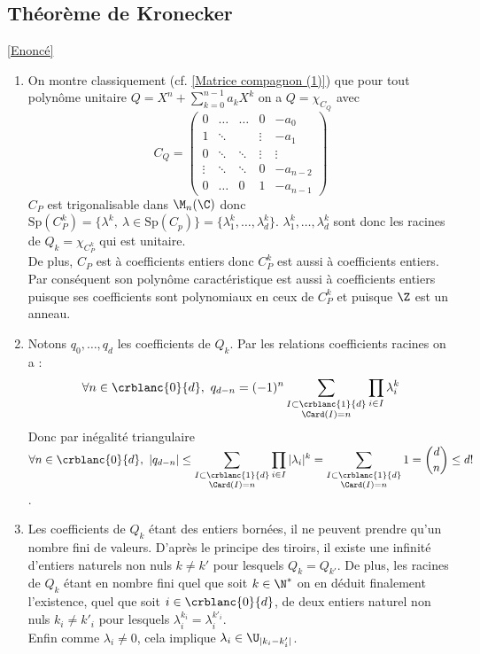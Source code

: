 \documentclass[8pt]{book}
\begin{document}
	\subsection{Théorème de Kronecker }
	\label{Théorème de Kronecker corrigé}
	\textcolor{blue}{\hyperref[Théorème de Kronecker]{[Enoncé]}}\\
	\begin{enumerate}[leftmargin=*]
		\item On montre classiquement (cf. \ref{Matrice compagnon (1)}) que pour tout polynôme unitaire $Q=X^n+\displaystyle\sum_{k=0}^{n-1}a_kX^k$ on a $Q=\chi_{C_Q}$ avec $$C_Q=
		\begin{pmatrix}
			0&\dots&\dots&0&-a_0\\
			1&\ddots&\ &\vdots&-a_1\\
			0&\ddots&\ddots&\vdots&\vdots\\
			\vdots&\ddots&\ddots&0&-a_{n-2}\\
			0&\dots&0&1&-a_{n-1}
		\end{pmatrix}$$
		$C_P$ est trigonalisable dans $\M_n(\C)$ donc $\text{Sp}(C_P^k)=\{\lambda^k,\ \lambda\in \text{Sp}(C_p)\}=\{\lambda_1^k,\dots,\lambda_d^k\}$. $\lambda_1^k,\dots,\lambda_d^k$ sont donc les racines de $Q_k=\chi_{C_P^k}$ qui est unitaire.\\
		De plus, $C_P$ est à coefficients entiers donc $C_P^k$ est aussi à coefficients entiers. Par conséquent son polynôme caractéristique est aussi à coefficients entiers puisque ses coefficients sont polynomiaux en ceux de $C_P^k$ et puisque $\Z$ est un anneau.
		\item Notons $q_0,\dots,q_d$ les coefficients de $Q_k$. Par les relations coefficients racines on a :
		$$\forall n\in \crblanc{0}{d},\ q_{d-n}=(-1)^n\sum_{\substack{I\subset\crblanc{1}{d}\\\Card(I)=n}}\prod_{i\in I}\lambda_i^k$$
		Donc par inégalité triangulaire $\forall n\in \crblanc{0}{d},\ |q_{d-n}|\leq \displaystyle\sum_{\substack{I\subset\crblanc{1}{d}\\\Card(I)=n}}\prod_{i\in I}|\lambda_i|^k=\sum_{\substack{I\subset\crblanc{1}{d}\\\Card(I)=n}}1=\binom{d}{n}\leq d!$.\\
		\item Les coefficients de $Q_k$ étant des entiers bornées, il ne peuvent prendre qu'un nombre fini de valeurs. D'après le principe des tiroirs, il existe une infinité d'entiers naturels non nuls $k\ne k'$ pour lesquels $Q_k=Q_{k'}$. De plus, les racines de $Q_k$ étant en nombre fini quel que soit $k\in \N^*$ on en déduit finalement l'existence, quel que soit $i\in \crblanc{0}{d}$, de deux entiers naturel non nuls $k_i\ne k'_i$ pour lesquels $\lambda_i^{k_i}=\lambda_i^{k'_i}$.\\
		Enfin comme $\lambda_i\ne 0$, cela implique $\lambda_i\in \U_{|k_i-k'_i|}$.
	\end{enumerate}
	
\end{document}
